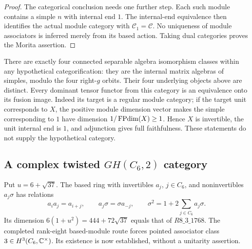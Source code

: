 \begin{proof}
The categorical conclusion needs one further step. Each such module
contains a simple $n$ with internal end $1$. The internal-end equivalence
then identifies the actual module category with $\mathcal C_1=\mathcal C$.
No uniqueness of module associators is inferred merely from its based
action. Taking dual categories proves the Morita assertion.
\end{proof}

There are exactly four connected separable algebra isomorphism classes
within any hypothetical categorification: they are the internal matrix
algebras of simples, modulo the four right-$g$ orbits. Their four
underlying objects above are distinct. Every dominant tensor functor
from this category is an equivalence onto its fusion image. Indeed its
target is a regular module category; if the target unit corresponds to
$X$, the positive module dimension vector makes the simple corresponding
to $1$ have dimension $1/\operatorname{FPdim}(X)\ge1$. Hence $X$ is invertible, the
unit internal end is $1$, and adjunction gives full faithfulness.
These statements do not supply the hypothetical category.

\subsection{A complex twisted $GH(C_6,2)$ category}
Put $u=6+\sqrt{37}$. The based ring with invertibles $a_j$, $j\in C_6$,
and noninvertibles $a_j\sigma$ has relations
\[
 a_ia_j=a_{i+j},\qquad a_j\sigma=\sigma a_{-j},\qquad
 \sigma^2=1+2\sum_{j\in C_6}a_j\sigma.
\]
Its dimension $6(1+u^2)=444+72\sqrt{37}$ equals that of $R8\_3\_1768$.
The completed rank-eight based-module route forces pointed associator
class $3\in H^3(C_6,\mathbb C^\times)$. Its existence is now established,
without a unitarity assertion.

